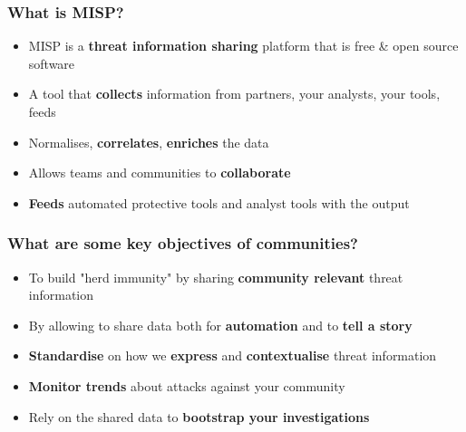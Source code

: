 \begin{frame}
\frametitle{What is MISP?}
\begin{itemize}
       \item MISP is a {\bf threat information sharing} platform that is free \& open source software
       \item A tool that {\bf collects} information from partners, your analysts, your tools, feeds
       \item Normalises, {\bf correlates}, {\bf enriches} the data
       \item Allows teams and communities to {\bf collaborate}
       \item {\bf Feeds} automated protective tools and analyst tools with the output
\end{itemize}
\end{frame}

\begin{frame}
\frametitle{What are some key objectives of communities?}
\begin{itemize}
       \item To build "herd immunity" by sharing {\bf community relevant} threat information
       \item By allowing to share data both for {\bf automation} and to {\bf tell a story}
       \item {\bf Standardise} on how we {\bf express} and {\bf contextualise} threat information
       \item {\bf Monitor trends} about attacks against your community
       \item Rely on the shared data to {\bf bootstrap your investigations}
\end{itemize}
\end{frame}

